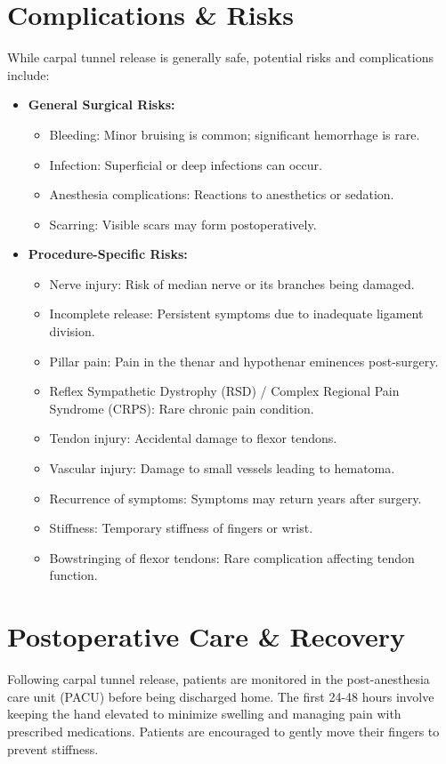 \section*{Complications \& Risks}
While carpal tunnel release is generally safe, potential risks and complications include:

\begin{itemize}
  \item \textbf{General Surgical Risks:}
  \begin{itemize}
    \item Bleeding: Minor bruising is common; significant hemorrhage is rare.
    \item Infection: Superficial or deep infections can occur.
    \item Anesthesia complications: Reactions to anesthetics or sedation.
    \item Scarring: Visible scars may form postoperatively.
  \end{itemize}
  
  \item \textbf{Procedure-Specific Risks:}
  \begin{itemize}
    \item Nerve injury: Risk of median nerve or its branches being damaged.
    \item Incomplete release: Persistent symptoms due to inadequate ligament division.
    \item Pillar pain: Pain in the thenar and hypothenar eminences post-surgery.
    \item Reflex Sympathetic Dystrophy (RSD) / Complex Regional Pain Syndrome (CRPS): Rare chronic pain condition.
    \item Tendon injury: Accidental damage to flexor tendons.
    \item Vascular injury: Damage to small vessels leading to hematoma.
    \item Recurrence of symptoms: Symptoms may return years after surgery.
    \item Stiffness: Temporary stiffness of fingers or wrist.
    \item Bowstringing of flexor tendons: Rare complication affecting tendon function.
  \end{itemize}
\end{itemize}

\section*{Postoperative Care \& Recovery}
Following carpal tunnel release, patients are monitored in the post-anesthesia care unit (PACU) before being discharged home. The first 24-48 hours involve keeping the hand elevated to minimize swelling and managing pain with prescribed medications. Patients are encouraged to gently move their fingers to prevent stiffness.


